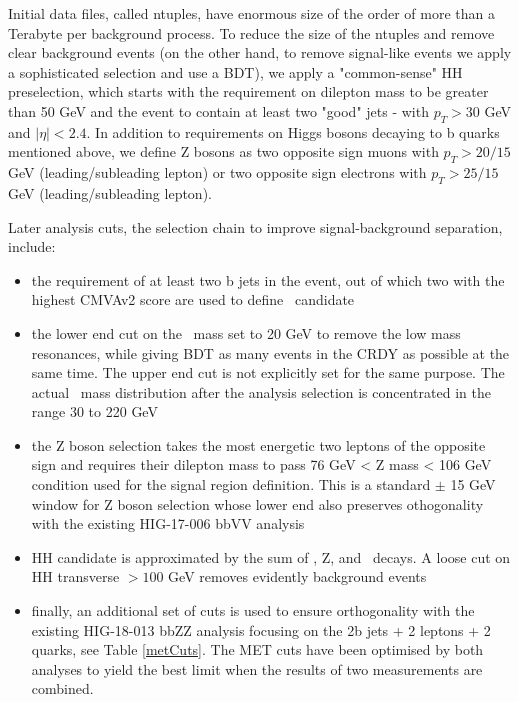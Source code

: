 Initial data files, called ntuples, have enormous size of the order of more than a Terabyte per background process. To reduce the size of the ntuples and remove clear background events (on the other hand, to remove signal-like events we apply a sophisticated selection and use a BDT), we apply a "common-sense" HH preselection, which starts with the requirement on dilepton mass to be greater than 50 GeV and the event to contain at least two "good" jets - with $p_{T} > 30$ GeV and $|\eta| < 2.4$. In addition to requirements on Higgs bosons decaying to b quarks mentioned above, we define Z bosons as two opposite sign muons with $p_{T} > 20/15$ GeV (leading/subleading lepton) or two opposite sign electrons with $p_{T} > 25/15$ GeV (leading/subleading lepton). 



Later analysis cuts, the selection chain to improve signal-background separation, include: 

 \begin{itemize}
 \item  the requirement of at least two b jets in the event, out of which two with the highest CMVAv2 score are used to define \HBB ~candidate
 \item  the lower end cut on the \HBB ~mass set to 20 GeV to remove the low mass resonances, while giving BDT as many events in the CRDY as possible at the same time. The upper end cut is not explicitly set for the same purpose. The actual \HBB ~mass distribution after the analysis selection is concentrated in the range 30 to 220 GeV
 \item  the Z boson selection takes the most energetic two leptons of the opposite sign and requires their dilepton mass to pass 76 GeV < Z mass < 106 GeV condition used for the signal region definition. This is a standard $\pm$ 15 GeV window for Z boson selection whose lower end also preserves othogonality with the existing HIG-17-006 bbVV analysis
 \item  HH candidate is approximated by the sum of \ETslash, Z, and \HBB~decays. A loose cut on HH transverse  $>100$ GeV removes evidently background events
 \item  finally, an additional set of \ETslash cuts is used to ensure orthogonality with the existing HIG-18-013 bbZZ analysis focusing on the 2b jets + 2 leptons + 2 quarks, see Table \ref{metCuts}. The MET cuts have been optimised by both analyses to yield the best limit when the results of two measurements are combined. 
 \end{itemize}



